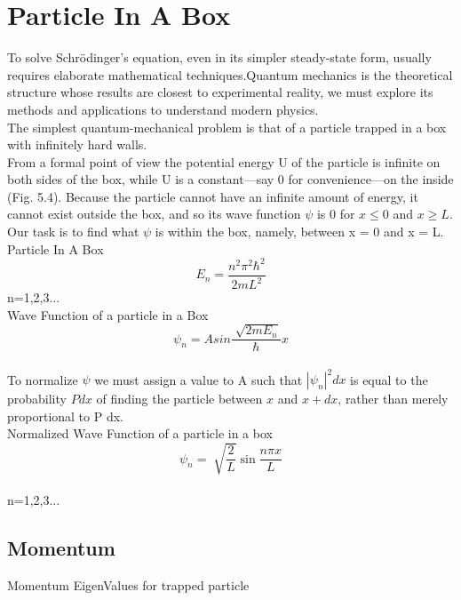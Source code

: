 \documentclass{article}
\begin{document}
\section*{Particle In A Box}
To solve Schrödinger's equation, even in its simpler steady-state form, usually requires elaborate mathematical techniques.Quantum mechanics is the theoretical structure
whose results are closest to experimental reality, we must explore its methods and applications to understand modern physics.\vspace{4pt}
\\
The simplest quantum-mechanical problem is that of a particle trapped in a box
with infinitely hard walls.
\\
From a formal point of view the potential energy U of the particle is infinite on both sides of
the box, while U is a constant—say 0 for convenience—on the inside (Fig. 5.4). Because
the particle cannot have an infinite amount of energy, it cannot exist outside the box,
and so its wave function $\psi$ is 0 for $x\le0$ and $x\ge L$. Our task is to find what $\psi$ is
within the box, namely, between x = 0 and x = L.\vspace{10pt}
\\
Particle In A Box
\begin{equation}
    E_n=\frac{n^2\pi^2\hbar^2}{2mL^2}  
\end{equation}
{n=1,2,3...}\vspace{10pt}
\\
Wave Function of a particle in a Box
\begin{equation}
    \psi_n=Asin\frac{\sqrt[]{2mE_n}}{\hbar}x
\end{equation}
\\
To normalize $\psi$ we must assign a value to A such that $|\psi_n|^2dx$ is equal to the probability $Pdx$ of finding the particle between $x$ and $x+dx$, rather than merely proportional to P dx.\vspace{10pt}
\\
Normalized Wave Function of a particle in a box
\begin{equation}
    \psi_n=\sqrt[]{\frac{2}{L}} \sin\frac{n\pi x}{L}
\end{equation} 
\\
n=1,2,3...

\subsection*{Momentum}

Momentum EigenValues for trapped particle
\end{document}

